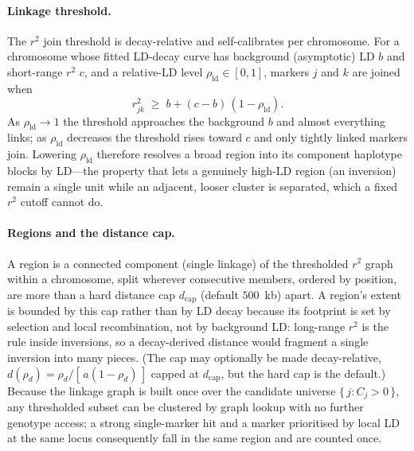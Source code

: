 \documentclass[11pt]{article}
\begin{document}
\paragraph{Linkage threshold.}
The $r^2$ join threshold is decay-relative and self-calibrates per chromosome. For
a chromosome whose fitted LD-decay curve has background (asymptotic) LD $b$ and
short-range $r^2$ $c$, and a relative-LD level $\rho_{\mathrm{ld}} \in [0,1]$,
markers $j$ and $k$ are joined when
\begin{equation}
  r^2_{jk} \;\ge\; b + (c - b)\,(1 - \rho_{\mathrm{ld}}).
\end{equation}
As $\rho_{\mathrm{ld}} \to 1$ the threshold approaches the background $b$ and
almost everything links; as $\rho_{\mathrm{ld}}$ decreases the threshold rises
toward $c$ and only tightly linked markers join. Lowering $\rho_{\mathrm{ld}}$
therefore resolves a broad region into its component haplotype blocks by LD---the
property that lets a genuinely high-LD region (an inversion) remain a single unit
while an adjacent, looser cluster is separated, which a fixed $r^2$ cutoff cannot
do.

\paragraph{Regions and the distance cap.}
A region is a connected component (single linkage) of the thresholded $r^2$ graph
within a chromosome, split wherever consecutive members, ordered by position, are
more than a hard distance cap $d_{\mathrm{cap}}$ (default $500$~kb) apart. A
region's extent is bounded by this cap rather than by LD decay because its
footprint is set by selection and local recombination, not by background LD:
long-range $r^2$ is the rule inside inversions, so a decay-derived distance would
fragment a single inversion into many pieces. (The cap may optionally be made
decay-relative, $d(\rho_d) = \rho_d / [\,a(1-\rho_d)\,]$ capped at
$d_{\mathrm{cap}}$, but the hard cap is the default.) Because the linkage graph is
built once over the candidate universe $\{\, j : C_j > 0 \,\}$, any thresholded
subset can be clustered by graph lookup with no further genotype access; a strong
single-marker hit and a marker prioritised by local LD at the same locus
consequently fall in the same region and are counted once.
\end{document}
